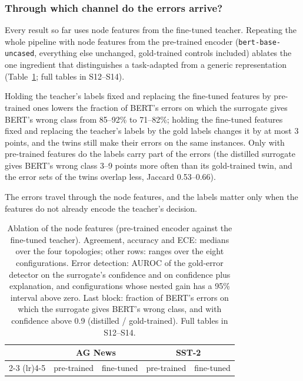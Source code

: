 \documentclass[preprint, times, review, 10pt]{elsarticle}
\begin{document}
\subsubsection{Through which channel do the errors arrive?} \label{sec:inherit_channel}
Every result so far uses node features from the fine-tuned teacher. Repeating the whole pipeline with node features from the pre-trained encoder (\texttt{bert-base-uncased}, everything else unchanged, gold-trained controls included) ablates the one ingredient that distinguishes a task-adapted from a generic representation (Table~\ref{tab:ablation}; full tables in S12--S14).

Holding the teacher's labels fixed and replacing the fine-tuned features by pre-trained ones lowers the fraction of BERT's errors on which the surrogate gives BERT's wrong class from 85--92\% to 71--82\%; holding the fine-tuned features fixed and replacing the teacher's labels by the gold labels changes it by at most 3 points, and the twins still make their errors on the same instances. Only with pre-trained features do the labels carry part of the errors (the distilled surrogate gives BERT's wrong class 3--9 points more often than its gold-trained twin, and the error sets of the twins overlap less, Jaccard 0.53--0.66).

The errors travel through the node features, and the labels matter only when the features do not already encode the teacher's decision.

\begin{table}[H]
\centering
\scriptsize
\setlength{\tabcolsep}{3pt}
\caption{Ablation of the node features (pre-trained encoder against the fine-tuned teacher). Agreement, accuracy and ECE: medians over the four topologies; other rows: ranges over the eight configurations. Error detection: AUROC of the gold-error detector on the surrogate's confidence and on confidence plus explanation, and configurations whose nested gain has a 95\% interval above zero. Last block: fraction of BERT's errors on which the surrogate gives BERT's wrong class, and with confidence above 0.9 (distilled / gold-trained). Full tables in S12--S14.}
\label{tab:ablation}
\begin{tabular}{@{}lcccc@{}}
\toprule
& \multicolumn{2}{c}{\textbf{AG News}} & \multicolumn{2}{c}{\textbf{SST-2}} \\
\cmidrule(lr){2-3} \cmidrule(lr){4-5}
& pre-trained & fine-tuned & pre-trained & fine-tuned \\
\midrule

\end{tabular}
\end{table}
\end{document}
